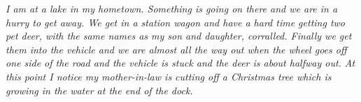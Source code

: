 \begin{minipage}[t]{0.75\textwidth}
\begin{spacing}{0.5}
    {\scriptsize \it
    I am at a lake in my hometown.
    Something is going on there and we are in a hurry to get away.
    We get in a station wagon and have a hard time getting two pet deer, with the same names as my son and daughter,
    corralled.
    Finally we get them into the vehicle and we are almost all the way out when the wheel goes off one side of the road
    and the vehicle is stuck and the deer is about halfway out. At this point I notice my mother-in-law is cutting off
    a Christmas tree which is growing in the water at the end of the dock.}
\end{spacing}
\end{minipage}
